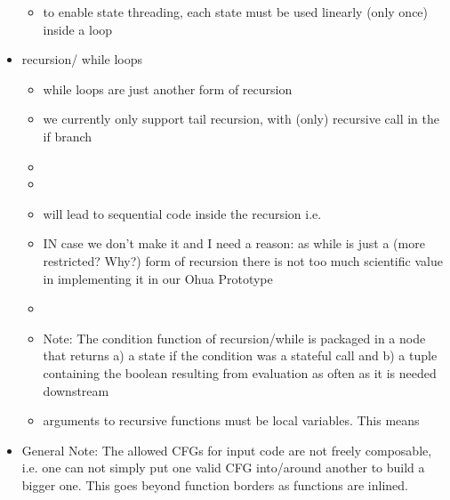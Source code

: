 \begin{itemize}
\begin{itemize}
        \item to enable state threading, each state must be used linearly (only once) inside a loop
    \end{itemize}
    \item recursion/ while loops
    \begin{itemize}
        \item while loops are just another form of recursion 
        \item we currently only support tail recursion, with (only) recursive call in the if branch 
        \item {}
        \item {}
        \item will lead to sequential code inside the recursion i.e.  
        \item IN case we don't make it and I need a reason: as while is just a (more restricted? Why?) form of recursion
        there is not too much scientific value in implementing it in our Ohua Prototype
        \item {}
        \item Note: The condition function of recursion/while is packaged in a node that returns a) a state if the condition was a stateful call and b) a tuple containing the boolean resulting from evaluation as often as it is needed downstream 
        \item arguments to recursive functions must be local variables. This means  
    \end{itemize}
    \item General Note: The allowed CFGs for input code are not freely composable, i.e. one can not simply put one valid CFG  into/around another to build a bigger one. This  goes beyond function borders as functions are inlined. 
\end{itemize}

